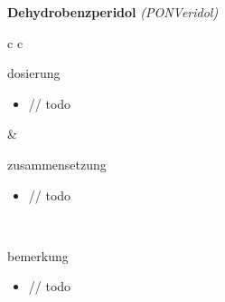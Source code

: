 \begin{frame}{
    \textbf{Dehydrobenzperidol}
    \textit{(PONVeridol)}
}
    \begin{tabular}{c c}
        \begin{beamercolorbox}[wd=\boxwidth\textwidth,ht=\boxheight\textheight,sep=1em]{dosierung}
            \begin{itemize}
                \item // todo
            \end{itemize}
        \end{beamercolorbox} & 
        \begin{beamercolorbox}[wd=\boxwidth\textwidth,ht=\boxheight\textheight,sep=1em]{zusammensetzung}
            \begin{itemize}
                \item // todo
            \end{itemize}
        \end{beamercolorbox} \\
        \begin{beamercolorbox}[wd=\textwidth,ht=\boxheight\textheight,sep=1em]{bemerkung}
            \begin{itemize}
                \item // todo
            \end{itemize}
        \end{beamercolorbox} \\
    \end{tabular}
\end{frame}


